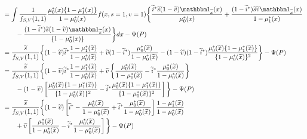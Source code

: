 \documentclass{article}
\begin{document}
\begin{align*}
   &= \int \dfrac{1}{f_{S,V}(1, 1)} \dfrac{\mu^*_0(x)\{1 - \mu^*_1(x)\}}{1 - \mu^*_0(x)}f(x, s=1, v=1) \bigg\{\dfrac{\widetilde{i}^*\widetilde{s}(1-\widetilde{v})\mathbbm 1_{\widetilde{x}}(x)}{\mu^*_0(x)} + \dfrac{(1-\widetilde{i}^*)\widetilde{s}\widetilde{v}\mathbbm 1_{\widetilde{x}}(x)}{1 - \mu^*_1(x)} \\
   &\qquad - \dfrac{(1-\widetilde{i}^*)\widetilde{s}(1-\widetilde{v})\mathbbm 1_{\widetilde{x}}(x)}{\{1 - \mu^*_0(x)\}}\bigg\} dx - \Psi(P) \\
   &=\dfrac{\widetilde s}{f_{S,V}(1, 1)}  \bigg\{(1 - \widetilde v)\widetilde i^*\dfrac{1 - \mu^*_1(\widetilde x)}{1 - \mu^*_0(\widetilde x)} + \widetilde v (1 - \widetilde i^*) \dfrac{\mu^*_0(\widetilde x)}{1 - \mu^*_0(\widetilde x)} -  (1 - \widetilde v) (1 - \widetilde i^*)\dfrac{\mu^*_0(\widetilde x)\{1 - \mu^*_1(\widetilde x)\}}{\{1 - \mu^*_0(\widetilde x)\}^2}  \bigg\}  - \Psi(P) \\
   &=\dfrac{\widetilde s}{f_{S,V}(1, 1)}  \bigg\{(1 - \widetilde v)\widetilde i^*\dfrac{1 - \mu^*_1(\widetilde x)}{1 - \mu^*_0(\widetilde x)} + \widetilde v \left\{\dfrac{\mu^*_0(\widetilde x)}{1 - \mu^*_0(\widetilde x)} - \widetilde i^* \dfrac{\mu^*_0(\widetilde x)}{1 - \mu^*_0(\widetilde x)}\right\} \\
   &\qquad -  (1 - \widetilde v) \left[\dfrac{\mu^*_0(\widetilde x)\{1 - \mu^*_1(\widetilde x)\}}{\{1 - \mu^*_0(\widetilde x)\}^2} - \widetilde i^*\dfrac{\mu^*_0(\widetilde x)\{1 - \mu^*_1(\widetilde x)\}}{\{1 - \mu^*_0(\widetilde x)\}^2}\right]  \bigg\}  - \Psi(P) \\
   &=\dfrac{\widetilde s}{f_{S,V}(1, 1)}  \bigg\{(1 - \widetilde v) \left[\widetilde i^* - \dfrac{\mu^*_0(\widetilde x)}{1 - \mu^*_0(\widetilde x)}  + \widetilde i^*\dfrac{\mu^*_0(\widetilde x)}{1 - \mu^*_0(\widetilde x)}\right]\dfrac{1 - \mu^*_1(\widetilde x)}{1 - \mu^*_0(\widetilde x)}\\
   &\qquad   + \widetilde v \left[\dfrac{\mu^*_0(\widetilde x)}{1 - \mu^*_0(\widetilde x)} - \widetilde i^* \dfrac{\mu^*_0(\widetilde x)}{1 - \mu^*_0(\widetilde x)}\right] \bigg\}  - \Psi(P) \\

\end{align*}
\end{document}
